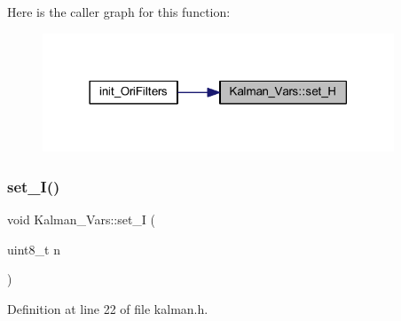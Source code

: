 Here is the caller graph for this function\+:
\nopagebreak
\begin{figure}[H]
\begin{center}
\leavevmode
\includegraphics[width=297pt]{struct_kalman___vars_ac46252628322507a132ae399227a6d18_icgraph}
\end{center}
\end{figure}
\mbox{\label{struct_kalman___vars_a9c818fcb9d72defe273c99a5378319ee}} 
\subsubsection{\texorpdfstring{set\_I()}{set\_I()}}
{\footnotesize\ttfamily void Kalman\+\_\+\+Vars\+::set\+\_\+I (\begin{DoxyParamCaption}\item[{uint8\+\_\+t}]{n }\end{DoxyParamCaption})\hspace{0.3cm}{\ttfamily [inline]}}



Definition at line 22 of file kalman.\+h.

